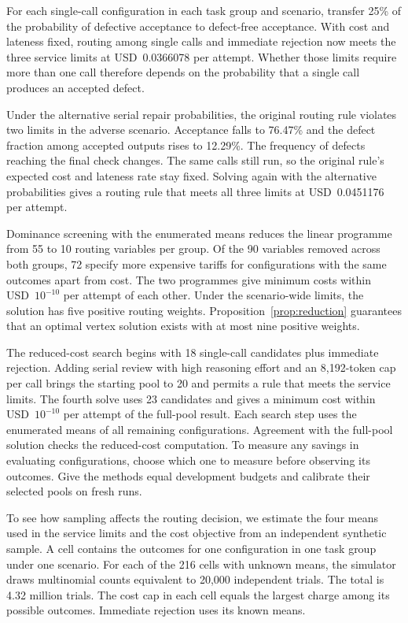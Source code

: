 \documentclass[11pt,reqno]{amsart}
\theoremstyle{definition}
\theoremstyle{remark}
\begin{document}
For each single-call configuration in each task group and scenario, transfer 25\% of the probability of defective acceptance to defect-free acceptance. With cost and lateness fixed, routing among single calls and immediate rejection now meets the three service limits at USD~0.0366078 per attempt. Whether those limits require more than one call therefore depends on the probability that a single call produces an accepted defect.

Under the alternative serial repair probabilities, the original routing rule violates two limits in the adverse scenario. Acceptance falls to 76.47\% and the defect fraction among accepted outputs rises to 12.29\%. The frequency of defects reaching the final check changes. The same calls still run, so the original rule's expected cost and lateness rate stay fixed. Solving again with the alternative probabilities gives a routing rule that meets all three limits at USD~0.0451176 per attempt.

Dominance screening with the enumerated means reduces the linear programme from 55 to 10 routing variables per group.
Of the 90 variables removed across both groups, 72 specify more expensive tariffs for configurations with the same outcomes apart from cost.
The two programmes give minimum costs within USD~$10^{-10}$ per attempt of each other.
Under the scenario-wide limits, the solution has five positive routing weights.
Proposition~\ref{prop:reduction} guarantees that an optimal vertex solution exists with at most nine positive weights.

The reduced-cost search begins with 18 single-call candidates plus immediate rejection.
Adding serial review with high reasoning effort and an 8,192-token cap per call brings the starting pool to 20 and permits a rule that meets the service limits.
The fourth solve uses 23 candidates and gives a minimum cost within USD~$10^{-10}$ per attempt of the full-pool result.
Each search step uses the enumerated means of all remaining configurations. Agreement with the full-pool solution checks the reduced-cost computation. To measure any savings in evaluating configurations, choose which one to measure before observing its outcomes. Give the methods equal development budgets and calibrate their selected pools on fresh runs.

To see how sampling affects the routing decision, we estimate the four means used in the service limits and the cost objective from an independent synthetic sample. A cell contains the outcomes for one configuration in one task group under one scenario.
For each of the 216 cells with unknown means, the simulator draws multinomial counts equivalent to 20,000 independent trials. The total is 4.32 million trials. The cost cap in each cell equals the largest charge among its possible outcomes. Immediate rejection uses its known means.
\end{document}
